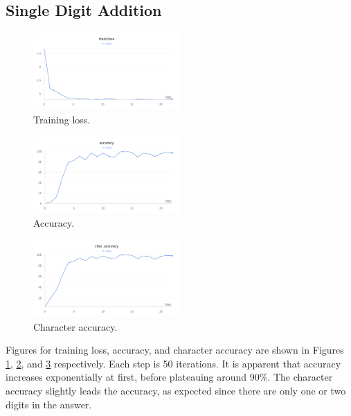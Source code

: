 \documentclass[12pt]{article}
\begin{document}
\subsection{Single Digit Addition}
\begin{figure}[h]
    \centering
    \includegraphics[width=0.5\textwidth]{figures/single-digit/single-digit-add-loss.png}
    \caption{Training loss.}
    \label{fig:single_digit_addition}
\end{figure}
\begin{figure}[h]
    \centering
    \includegraphics[width=0.5\textwidth]{figures/single-digit/single-digit-add-accuracy.png}
    \caption{Accuracy.}
    \label{fig:single_digit_addition_accuracy}
\end{figure}
\begin{figure}[h]
    \centering
    \includegraphics[width=0.5\textwidth]{figures/single-digit/single-digit-add-char-accuracy.png}
    \caption{Character accuracy.}
    \label{fig:single_digit_addition_char_accuracy}
\end{figure}
Figures for training loss, accuracy, and character accuracy are shown in Figures \ref{fig:single_digit_addition}, \ref{fig:single_digit_addition_accuracy}, and \ref{fig:single_digit_addition_char_accuracy} respectively.
Each step is 50 iterations.
It is apparent that accuracy increases exponentially at first, before plateauing around 90\%.
The character accuracy slightly leads the accuracy, as expected since there are only one or two digits in the answer.
\end{document}
